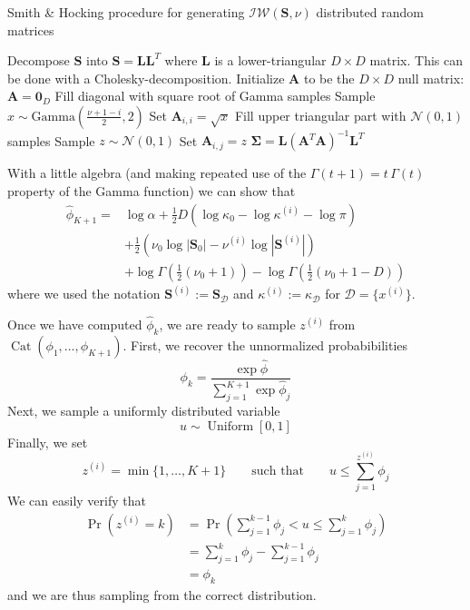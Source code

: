 \documentclass[final,3p,times,twocolumn]{elsarticle}
\DeclareMathOperator*{\Cat}{Cat}
\DeclareMathOperator*{\Uniform}{Uniform}
\let\bs\boldsymbol
\begin{document}
\begin{algorithm}
\caption{Smith \& Hocking procedure \cite{smith1972} for generating $\mathcal{IW}(\bs S,\nu)$ distributed random matrices}
\label{alg:IW}
\begin{algorithmic}[1]
\State Decompose $\bs S$ into $\bs S = \bs L \bs L^T$ where $\bs L$ is a lower-triangular $D \times D$ matrix. This can be done with a Cholesky-decomposition.
\State Initialize $\bs A$ to be the $D\times D$ null matrix: $\bs A = \bs 0_D$
\Statex\State\Comment Fill diagonal with square root of Gamma samples
\State Sample $x \sim \mbox{Gamma}\left(\frac{\nu + 1-i}{2},2\right)$
\State Set $\bs A_{i,i} = \sqrt x$
\EndFor
\Statex\State\Comment Fill upper triangular part with $\mathcal{N}(0,1)$ samples
\State Sample $z \sim \mathcal{N}(0,1)$
\State Set $\bs A_{i,j} = z$
\EndFor
\EndFor
\Statex\State \Return $\bs \Sigma = \bs L \left(\bs A^T \bs A\right)^{-1} \bs L^T$
\end{algorithmic}
\end{algorithm}

With a little algebra (and making repeated use of the $\Gamma(t+1) = t\,\Gamma(t)$ property of the Gamma function) we can show that
\begin{equation*}
\begin{split}
\hat \phi_{K+1} = &\log\alpha + \frac{1}{2}D\left(\log\kappa_0 - \log\kappa^{(i)} -\log\pi \right)\\
&+ \frac{1}{2}\left(\nu_0 \log|\bs S_0| - \nu^{(i)} \log|\bs S^{(i)}|\right)\\
&+ \log\Gamma\left(\frac{1}{2}(\nu_0 + 1)\right) - \log\Gamma\left(\frac{1}{2}(\nu_0 + 1 -D)\right)
\end{split}
\end{equation*}
where we used the notation $\bs S^{(i)} := \bs S_\mathcal{D}$ and $\kappa^{(i)} := \kappa_\mathcal{D}$ for $\mathcal{D} = \{x^{(i)}\}$.

Once we have computed $\hat\phi_k$, we are ready to sample $z^{(i)}$ from $\Cat(\phi_1,\dots,\phi_{K+1})$.
First, we recover the unnormalized probabibilities
\begin{equation*}
\phi_k = \frac{\exp \hat \phi}{\sum_{j=1}^{K+1}\exp\hat\phi_j}
\end{equation*}
Next, we sample a uniformly distributed variable
\begin{equation*}
u \sim \Uniform[0,1]
\end{equation*}
Finally, we set 
\begin{equation*}
z^{(i)} = \min\{1,\dots,K+1\} \qquad \mbox{such that}\qquad u \leq \sum_{j=1}^{z^{(i)}} \phi_j
\end{equation*}
We can easily verify that 
\begin{equation*}
\begin{split}
\Pr\left(z^{(i)} = k\right) &= \Pr\left(\sum_{j=1}^{k-1} \phi_j < u \leq \sum_{j=1}^k \phi_j\right)\\
&= \sum_{j=1}^k \phi_j - \sum_{j=1}^{k-1} \phi_j\\
&= \phi_k
\end{split}
\end{equation*}
and we are thus sampling from the correct distribution.
\end{document}
